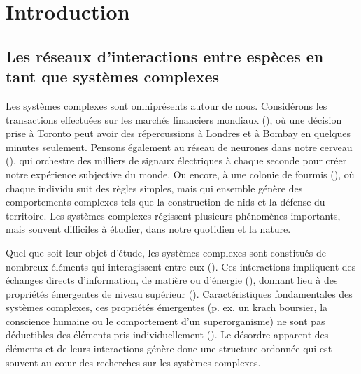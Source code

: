 
\francais   
\doublespacing
\chapter*{Introduction}



\section{Les réseaux d'interactions entre espèces en tant que systèmes complexes}

Les systèmes complexes sont omniprésents autour de nous. Considérons les
transactions effectuées sur les marchés financiers mondiaux
(\cite{Anderson2018Economy}), où une décision prise à Toronto peut avoir des
répercussions à Londres et à Bombay en quelques minutes seulement. Pensons
également au réseau de neurones dans notre cerveau (\cite{Sporns2011Human}), qui
orchestre des milliers de signaux électriques à chaque seconde pour créer notre
expérience subjective du monde. Ou encore, à une colonie de fourmis
(\cite{Bonabeau1999Swarm}), où chaque individu suit des règles simples, mais qui
ensemble génère des comportements complexes tels que la construction de nids et
la défense du territoire. Les systèmes complexes régissent plusieurs phénomènes
importants, mais souvent difficiles à étudier, dans notre quotidien et la
nature. 

Quel que soit leur objet d'étude, les systèmes complexes sont constitués de
nombreux éléments qui interagissent entre eux (\cite{Rind1999Complexity}). Ces
interactions impliquent des échanges directs d'information, de matière ou
d'énergie (\cite{Ladyman2013What}), donnant lieu à des propriétés émergentes de
niveau supérieur (\cite{Foote2007Mathematics}). Caractéristiques fondamentales
des systèmes complexes, ces propriétés émergentes (p. ex. un krach boursier, la
conscience humaine ou le comportement d'un superorganisme) ne sont pas
déductibles des éléments pris individuellement (\cite{Nielsen2000Emergent}). Le
désordre apparent des éléments et de leurs interactions génère donc une
structure ordonnée qui est souvent au cœur des recherches sur les systèmes
complexes. 

